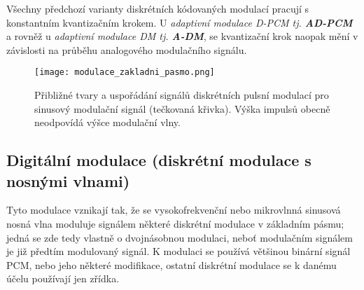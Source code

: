       Všechny předchozí varianty diskrétních kódovaných modulací pracují s konstantním kvantizačním krokem. 
      U \emph{adaptivní modulace D-PCM tj. \textbf{AD-PCM}} a rovněž u \emph{adaptivní modulace DM tj. 
      \textbf{A-DM}}, se kvantizační krok naopak mění v závislosti na průběhu analogového modulačního signálu.
    
    \begin{figure}[ht!]  %
      \centering
      \texttt{[image: modulace\_zakladni\_pasmo.png]}
      \caption{Přibližné tvary a uspořádání signálů diskrétních pulsní modulací pro sinusový modulační signál 
      (tečkovaná křivka). Výška impulsů obecně neodpovídá výšce modulační vlny.}
      \label{fig_RA:modulace04}
    \end{figure}
    
    \subsection{Digitální modulace (diskrétní modulace s nosnými vlnami)}
      Tyto modulace vznikají tak, že se vysokofrekvenční nebo mikrovlnná sinusová nosná vlna moduluje 
      signálem některé diskrétní modulace v základním pásmu; jedná se zde tedy vlastně o dvojnásobnou 
      modulaci, neboť modulačním signálem je již předtím modulovaný signál. K modulaci se používá většinou 
      binární signál PCM, nebo jeho některé modifikace, ostatní diskrétní modulace se k danému účelu 
      používají jen zřídka.
      
